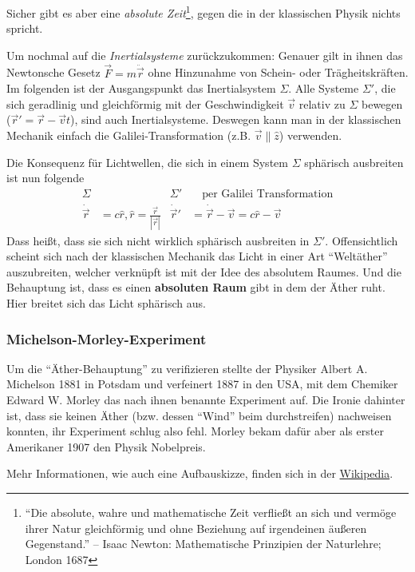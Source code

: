 \documentclass[oneside]{book}
\theoremstyle{definition}
\newcommand{\dotvec}[1]{\dot{\vec{#1}}}
\newcommand{\ddotvec}[1]{\ddot{\vec{#1}}}
\begin{document}
Sicher gibt es aber eine \textit{absolute Zeit}\footnote{
	"`Die absolute, wahre und mathematische Zeit verfließt an sich und vermöge ihrer Natur gleichförmig und ohne Beziehung auf irgendeinen äußeren Gegenstand."'
	– Isaac Newton: Mathematische Prinzipien der Naturlehre; London 1687}, gegen die in der klassischen Physik nichts spricht.

Um nochmal auf die \textit{Inertialsysteme} zurückzukommen: Genauer gilt in ihnen das Newtonsche Gesetz $\vec{F} = m \ddotvec{r}$ ohne Hinzunahme von Schein- oder Trägheitskräften. Im folgenden ist der Ausgangspunkt das Inertialsystem $\Sigma$.
Alle Systeme $\Sigma'$, die sich geradlinig und gleichförmig mit der Geschwindigkeit $\vec v$ relativ zu $\Sigma$ bewegen ($\vec{r}' = \vec{r} - \vec{v}t$), sind auch Inertialsysteme. Deswegen kann man in der klassischen Mechanik einfach die Galilei-Transformation (z.B. $\vec{v} \parallel \hat{z}$) verwenden.

Die Konsequenz für Lichtwellen, die sich in einem System $\Sigma$ sphärisch ausbreiten ist nun folgende
\begin{align*}
	\Sigma& & \Sigma'& \text{~~~per Galilei Transformation}\\
	\dotvec{r} &= c \hat{r}, \hat{r} = \frac{\vec{r}}{|\vec{r}|} & \dotvec{r}' &= \dotvec{r} - \vec{v} = c \hat{r} - \vec{v}   
\end{align*}
Dass heißt, dass sie sich nicht wirklich sphärisch ausbreiten in $\Sigma'$. Offensichtlich scheint sich nach der klassischen Mechanik das Licht in einer Art "`Weltäther"' auszubreiten, welcher verknüpft ist mit der Idee des absolutem Raumes. Und die Behauptung ist, dass es einen \textbf{absoluten Raum} gibt in dem der Äther ruht. Hier breitet sich das Licht sphärisch aus.

\subsubsection{Michelson-Morley-Experiment}
Um die "`Äther-Behauptung"' zu verifizieren stellte der Physiker Albert A. Michelson 1881 in Potsdam und verfeinert 1887 in den USA, mit dem Chemiker Edward W. Morley das nach ihnen benannte Experiment auf. Die Ironie dahinter ist, dass sie keinen Äther (bzw. dessen "`Wind"' beim durchstreifen) nachweisen konnten, ihr Experiment schlug also fehl. Morley bekam dafür aber als erster Amerikaner 1907 den Physik Nobelpreis.

Mehr Informationen, wie auch eine Aufbauskizze, finden sich in der \href{https://de.wikipedia.org/wiki/Michelson-Morley-Experiment}{Wikipedia}.
\end{document}
